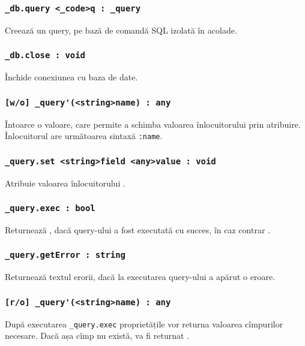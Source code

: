 \subsubsection{\lstinline|_db.query <_code>q : _query|}

Creează un query, pe bază de comandă SQL izolată în acolade.

\subsubsection{\lstinline|_db.close : void|}

Închide conexiunea cu baza de date.

\subsubsection{\lstinline|[w/o] _query'(<string>name) : any|}

Întoarce o valoare, care permite a schimba valoarea înlocuitorului prin atribuire. Înlocuitorul are următoarea sintaxă \lstinline|:name|.

\subsubsection{\lstinline|_query.set <string>field <any>value : void|}

Atribuie valoarea înlocuitorului .

\subsubsection{\lstinline|_query.exec : bool|}

Returnează \true, dacă query-ului a fost executată cu succes, în caz contrar \false.

\subsubsection{\lstinline|_query.getError : string|}

Returnează textul erorii, dacă la executarea query-ului a apărut o eroare.

\subsubsection{\lstinline|[r/o] _query'(<string>name) : any|}

După executarea \lstinline|_query.exec| proprietățile vor returna valoarea cîmpurilor necesare. Dacă așa cîmp nu există, va fi returnat \void.

